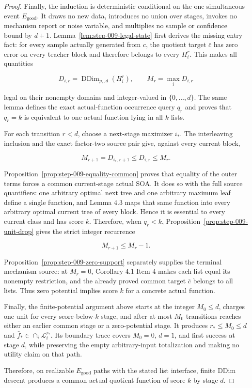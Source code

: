 \begin{proof}
Finally, the induction is deterministic conditional on the one
simultaneous event \(E_{\mathrm{good}}\). It draws no new data, introduces
no union over stages, invokes no mechanism report or noise variable, and
multiplies no sample or confidence bound by \(d+1\). 
Lemma~\ref{lem:step-009-legal-state} first derives the missing entry fact:
for every sample actually generated from \(c\), the quotient target
\(\bar c\) has zero error on every teacher block and therefore belongs to
every \(H_i^r\). This makes all quantities

\[
 D_{i,r}=\operatorname{DDim}_{p_r,d}(H_i^r),
 \qquad M_r=\max_iD_{i,r}
\]

legal on their nonempty domains and integer-valued in
\(\{0,\ldots,d\}\). The same lemma defines the exact actual-function
occurrence query \(q_r\) and proves that \(q_r=k\) is equivalent to one
actual function lying in all \(k\) lists.

For each transition \(r<d\), choose a next-stage maximizer \(i_*\).
The  interleaving inclusion and the exact factor-two source pair
give, against every current block,

\[
 M_{r+1}=D_{i_*,r+1}\le D_{i,r}\le M_r.
\]

Proposition~\ref{prop:step-009-equality-common} proves that equality of the
outer terms forces a common current-stage actual SOA. It does so with the
full source quantifiers: one arbitrary optimal next tree and one arbitrary
maximum leaf define a single function, and Lemma 4.3 maps that same
function into every arbitrary optimal current tree of every block. Hence
it is essential to every current class and has score \(k\). Therefore,
when \(q_r<k\), Proposition~\ref{prop:step-009-unit-drop} gives the strict
integer recurrence

\[
 M_{r+1}\le M_r-1.
\]

Proposition~\ref{prop:step-009-zero-support} separately supplies the
terminal mechanism source: at \(M_r=0\), Corollary 4.1 Item 4 makes each
list equal its nonempty restriction, and the already proved common target
\(\bar c\) belongs to all lists. Thus zero potential implies score \(k\)
for a concrete actual function.

Finally, the finite-potential argument above starts at the integer
\(M_0\le d\), charges one unit for every score-below-\(k\) stage, and after
at most \(M_0\) transitions reaches either an earlier common stage or a
zero-potential stage. It produces \(r_*\le M_0\le d\) and
\(\bar f_*\in\cap_i\mathcal L_i^{r_*}\). Its boundary trace covers
\(M_0=0\), \(d=1\), and first success at stage \(d\), while preserving the
empty arbitrary-input totalization and making no utility claim on
that path.

Therefore, on realizable \(E_{\mathrm{good}}\) paths with the stated list
interface, finite DDim descent produces a common actual quotient function
of score \(k\) by stage \(d\).



\end{proof}

